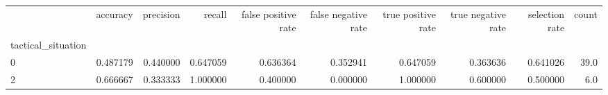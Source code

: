\begin{tabular}{lrrrrrrrrr}
\toprule
{} &  accuracy &  precision &    recall &  false positive rate &  false negative rate &  true positive rate &  true negative rate &  selection rate &  count \\
tactical\_situation &           &            &           &                      &                      &                     &                     &                 &        \\
\midrule
0                  &  0.487179 &   0.440000 &  0.647059 &             0.636364 &             0.352941 &            0.647059 &            0.363636 &        0.641026 &   39.0 \\
2                  &  0.666667 &   0.333333 &  1.000000 &             0.400000 &             0.000000 &            1.000000 &            0.600000 &        0.500000 &    6.0 \\
\bottomrule
\end{tabular}
